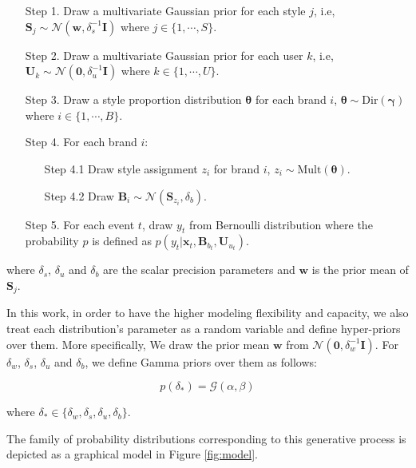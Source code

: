 \begin{enumerate}
\item[Step 1.] Draw a multivariate Gaussian prior for each style $j$, i.e, $\mathbf{S}_j \sim \mathcal{N}(\mathbf{w}, \delta_s^{-1}\mathbf{I})$ where $j \in \{1, \cdots, S\}$.

\item[Step 2.] Draw a multivariate Gaussian prior for each user $k$, i.e, $\mathbf{U}_k \sim \mathcal{N}(\mathbf{0}, \delta_u^{-1}\mathbf{I})$ where $k \in \{1, \cdots, U\}$.

\item[Step 3.] Draw a style proportion distribution $\boldsymbol{\theta}$ for each brand $i$, $\boldsymbol{\theta} \sim \mbox{Dir}(\boldsymbol{\gamma})$  where $i \in \{1, \cdots, B\}$.

\item[Step 4.] For each brand $i$:
	\begin{enumerate}
		\item[Step 4.1] Draw style assignment $z_{i}$ for brand $i$, $z_{i} \sim \mbox{Mult}(\boldsymbol{\theta})$.
		\item[Step 4.2] Draw $\mathbf{B}_i \sim \mathcal{N}(\mathbf{S}_{z_i}, \delta_b)$.
	\end{enumerate}

\item[Step 5.] For each event $t$, draw $y_t$ from Bernoulli distribution where the probability $p$ is defined as $p(y_t|\mathbf{x}_t, \mathbf{B}_{b_t}, \mathbf{U}_{u_t})$.
\end{enumerate}

\noindent where $\delta_s$, $\delta_u$ and $\delta_b$ are the scalar precision parameters and $\mathbf{w}$ is the prior mean of $\mathbf{S}_j$. 

In this work, in order to have the higher modeling flexibility and capacity, we also treat each distribution's parameter as a random variable and define hyper-priors over them. More specifically, We draw the prior mean $\mathbf{w}$ from $\mathcal{N}(\mathbf{0}, \delta_w^{-1}\mathbf{I})$. For $\delta_w$, $\delta_s$, $\delta_u$ and $\delta_b$, we define Gamma priors over them as follows: 

\begin{equation}
p(\delta_*) = \mathcal{G}(\alpha, \beta)
\end{equation}

\noindent where $\delta_* \in \{ \delta_w, \delta_s, \delta_u, \delta_b \}$. 

The family of probability distributions corresponding to this generative process is depicted as a graphical model in Figure \ref{fig:model}.

